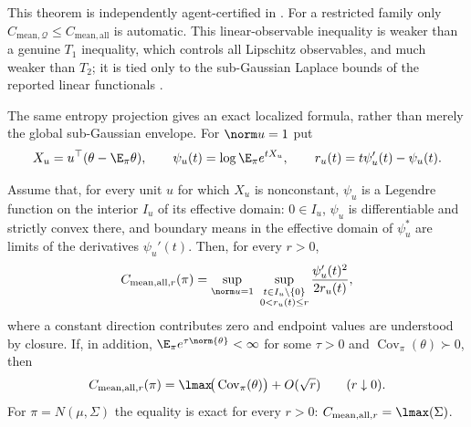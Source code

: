 \documentclass[../../main.tex]{subfiles}
\begin{document}
This theorem is independently agent-certified in
.
For a restricted family only
$C_{\mathrm{mean},\mathcal Q}\le C_{\mathrm{mean},\mathrm{all}}$ is automatic. This
linear-observable inequality is weaker than a genuine $T_1$ inequality, which controls all
Lipschitz observables, and much weaker than $T_2$; it is tied only to the sub-Gaussian Laplace
bounds of the reported linear functionals \cite{BolleyVillani2005}.

The same entropy projection gives an exact localized formula, rather than merely the global
sub-Gaussian envelope. For $\norm u=1$ put
\[
 X_u=u^\top(\theta-\E_\pi\theta),\qquad
 \psi_u(t)=\log\E_\pi e^{tX_u},\qquad
 r_u(t)=t\psi_u'(t)-\psi_u(t).
\]

\begin{proposition}
\label{prop:a4-mean-local}
Assume that, for every unit $u$ for which $X_u$ is nonconstant, $\psi_u$ is a Legendre function
on the interior $I_u$ of its effective domain: $0\in I_u$, $\psi_u$ is differentiable and
strictly convex there, and boundary means in the effective domain of $\psi_u^*$ are limits of
the derivatives $\psi_u'(t)$. Then, for every $r>0$,
\begin{equation}\label{eq:a4-mean-local-dual}
 C_{\mathrm{mean},\mathrm{all},r}(\pi)
 =\sup_{\norm u=1}\ \sup_{\substack{t\in I_u\setminus\{0\}\\0<r_u(t)\le r}}
 \frac{\psi_u'(t)^2}{2r_u(t)},
\end{equation}
where a constant direction contributes zero and endpoint values are understood by closure.
If, in addition, $\E_\pi e^{\tau\norm{\theta}}<\infty$ for some $\tau>0$ and
$\operatorname{Cov}_\pi(\theta)\succ0$, then
\begin{equation}\label{eq:a4-mean-local-cov}
 C_{\mathrm{mean},\mathrm{all},r}(\pi)
 =\lmax\!\big(\operatorname{Cov}_\pi(\theta)\big)+O(\sqrt r)
 \qquad(r\downarrow0).
\end{equation}
For $\pi=N(\mu,\Sigma)$ the equality is exact for every $r>0$:
$C_{\mathrm{mean},\mathrm{all},r}=\lmax(\Sigma)$.
\end{proposition}
\end{document}
